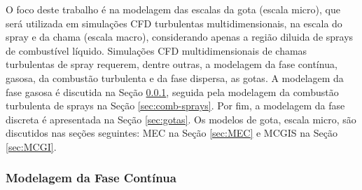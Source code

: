 O foco deste trabalho é na modelagem das escalas da gota (escala micro), que será utilizada em simulações CFD turbulentas multidimensionais, na escala do spray e da chama (escala macro), considerando apenas a região diluida de sprays de combustível líquido.
Simulações CFD multidimensionais de chamas turbulentas de spray requerem, dentre outras, a modelagem da fase contínua, gasosa, da combustão turbulenta e da fase dispersa, as gotas.
A modelagem da fase gasosa é discutida na Seção \ref{sec:gas}, seguida pela modelagem da combustão turbulenta de sprays na Seção \ref{sec:comb-sprays}. 
Por fim, a modelagem da fase discreta é apresentada na Seção \ref{sec:gotas}.
Os modelos de gota, escala micro, são discutidos nas seções seguintes: MEC na Seção	\ref{sec:MEC} e MCGIS na Seção \ref{sec:MCGI}.





\subsubsection{Modelagem da Fase Contínua} \label{sec:gas}


